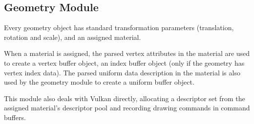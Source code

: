 \subsection{Geometry Module}
Every geometry object has standard transformation parameters (translation, rotation and scale), and an assigned material.

When a material is assigned, the parsed vertex attributes in the material are used to create a vertex buffer object, an index buffer object (only if the geometry has vertex index data). The parsed uniform data description in the material is also used by the geometry module to create a uniform buffer object.

This module also deals with Vulkan directly, allocating a descriptor set from the assigned material's descriptor pool and recording drawing commands in command buffers.
